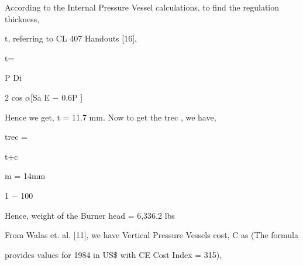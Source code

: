 \documentclass[a4paper,portrait,12pt]{article}
\begin{document}
\begin{flushleft}
According to the Internal Pressure Vessel calculations, to find the regulation thickness,
\end{flushleft}


\begin{flushleft}
t, referring to CL 407 Handouts [16],
\end{flushleft}


\begin{flushleft}
t=
\end{flushleft}





\begin{flushleft}
P Di
\end{flushleft}


\begin{flushleft}
2 cos $\alpha$[Sa E $-$ 0.6P ]
\end{flushleft}





\begin{flushleft}
Hence we get, t = 11.7 mm. Now to get the trec , we have,
\end{flushleft}


\begin{flushleft}
trec =
\end{flushleft}





\begin{flushleft}
t+c
\end{flushleft}


\begin{flushleft}
m = 14mm
\end{flushleft}


1 $-$ 100





\begin{flushleft}
Hence, weight of the Burner head = 6,336.2 lbs
\end{flushleft}


\begin{flushleft}
From Walas et. al. [11], we have Vertical Pressure Vessels cost, C as (The formula
\end{flushleft}


\begin{flushleft}
provides values for 1984 in US\$ with CE Cost Index = 315),
\end{flushleft}
\end{document}
